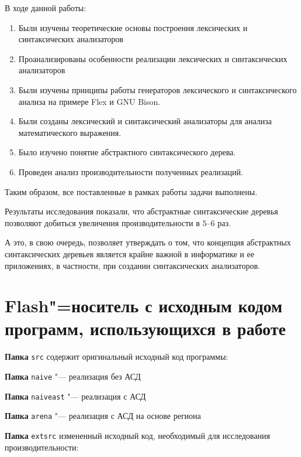 \documentclass[referat]{SCWorks}
\begin{document}
\conclusion
В ходе данной работы:
\begin{enumerate}
    \item Были изучены теоретические основы построения лексических и синтаксических анализаторов
    \item Проанализированы особенности реализации лексических и синтаксических анализаторов
    \item Были изучены принципы работы генераторов лексического и синтаксического анализа на примере Flex и GNU Bison.
    \item Были созданы лексический и синтаксический анализаторы для анализа математического выражения.
    \item Было изучено понятие абстрактного синтаксического дерева.
    \item Проведен анализ производительности полученных реализаций.
\end{enumerate}

Таким образом, все поставленные в рамках работы задачи выполнены.

Результаты исследования показали, что абстрактные синтаксические деревья позволяют добиться увеличения производительности в $5$--$6$ раз.

А это, в свою очередь, позволяет утверждать о том, что концепция абстрактных синтаксических деревьев является крайне важной в информатике и ее приложениях, в частности, при создании синтаксических анализаторов.




\appendix
\section{Flash"=носитель с исходным кодом программ, использующихся в работе}
\label{app:Flash"=носитель}

\noindent \textbf{Папка} \verb|src| содержит оригинальный исходный код программы:

\textbf{Папка} \verb|naive| "--- реализация без АСД

\textbf{Папка} \verb|naiveast|  "--- реализация с АСД

\textbf{Папка} \verb|arena| "--- реализация с АСД на основе региона


\noindent \textbf{Папка} \verb|extsrc| измененный исходный код, необходимый для исследования производительности:
\end{document}
